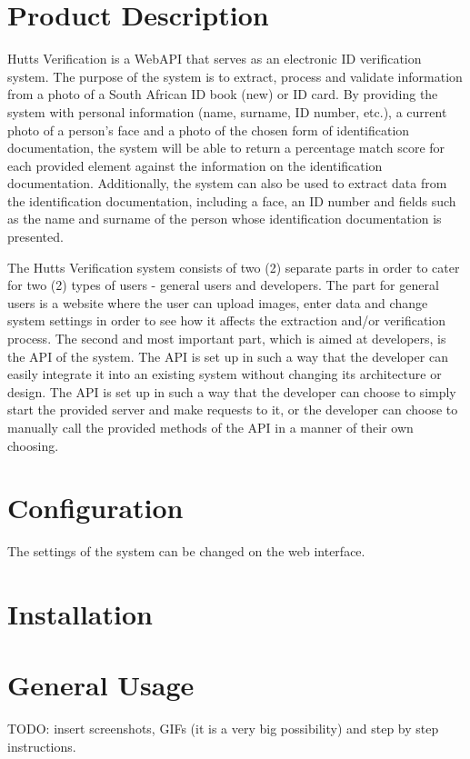 \documentclass{article}
\def \system{Hutts Verification}
\begin{document}
\section{Product Description}
{\system} is a WebAPI that serves as an electronic ID verification system. The purpose of the system is to extract, process and validate information from a photo of a South African ID book (new) or ID card. By providing the system with personal information (name, surname, ID number, etc.), a current photo of a person's face and a photo of the chosen form of identification documentation, the system will be able to return a percentage match score for each provided element against the information on the identification documentation. Additionally, the system can also be used to extract data from the identification documentation, including a face, an ID number and fields such as the name and surname of the person whose identification documentation is presented.

The {\system} system consists of two (2) separate parts in order to cater for two (2) types of users - general users and developers. The part for general users is a website where the user can upload images, enter data and change system settings in order to see how it affects the extraction and/or verification process. The second and most important part, which is aimed at developers, is the API of the system. The API is set up in such a way that the developer can easily integrate it into an existing system without changing its architecture or design. The API is set up in such a way that the developer can choose to simply start the provided server and make requests to it, or the developer can choose to manually call the provided methods of the API in a manner of their own choosing.

\section{Configuration}
The settings of the system can be changed on the web interface.

\section{Installation}

\section{General Usage}
TODO: insert screenshots, GIFs (it is a very big possibility) and step by step instructions.
\end{document}
